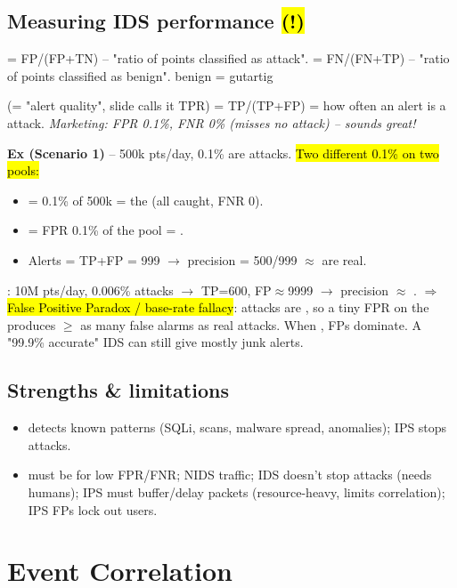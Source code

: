 \subsection{Measuring IDS performance \hl{(!)}}

 = FP/(FP+TN) -- "ratio of  points classified as attack".
 = FN/(FN+TP) -- "ratio of  points classified as benign". benign = gutartig

 (= "alert quality", slide calls it TPR) = TP/(TP+FP) = how often an alert is a  attack.
\textit{Marketing: FPR 0.1\%, FNR 0\% (misses no attack) -- sounds great!}

\textbf{Ex (Scenario 1)} -- 500k pts/day, 0.1\% are attacks. \hl{Two different 0.1\% on two pools:}
\begin{itemize}
\item {} = 0.1\% of  500k = the  (all caught, FNR 0).
\item {} = FPR 0.1\% of the  pool = .
\item Alerts = TP+FP = 999 $\to$ precision = 500/999 $\approx$  are real.
\end{itemize}
: 10M pts/day, 0.006\% attacks $\to$ TP=600, FP$\approx$9999 $\to$ precision $\approx$ .
$\Rightarrow$ \hl{False Positive Paradox / base-rate fallacy}: attacks are , so a tiny FPR on the  produces $\geq$ as many false alarms as real attacks. When , FPs dominate. A "99.9\% accurate" IDS can still give mostly junk alerts.

\subsection{Strengths \& limitations}
\begin{itemize}
\item \kw{+} detects known patterns (SQLi, scans, malware spread, anomalies); IPS stops attacks.
\item \kw{-} must be  for low FPR/FNR; NIDS  traffic; IDS doesn't stop attacks (needs humans); IPS must buffer/delay packets (resource-heavy, limits correlation); IPS FPs lock out users.
\end{itemize}

\section{Event Correlation}

